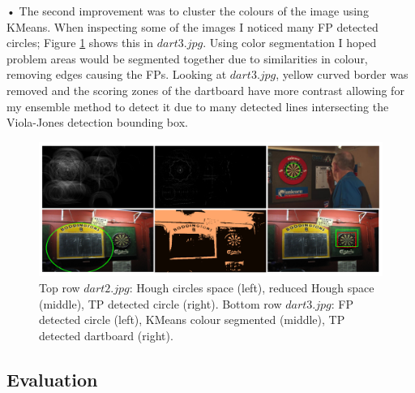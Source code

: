 \documentclass[11pt]{article}
\begin{document}
\noindent • The second improvement was to cluster the colours of the image using KMeans. When inspecting some of the images I noticed many FP detected circles; Figure \ref{detector_improvement_images} shows this in $dart3.jpg$. Using color segmentation I hoped problem areas would be segmented together due to similarities in colour, removing edges causing the FPs. Looking at $dart3.jpg$, yellow curved border was removed and the scoring zones of the dartboard have more contrast allowing for my ensemble method to detect it due to many detected lines intersecting the Viola-Jones detection bounding box.

\begin{figure}[h]
\centering
\includegraphics[width=0.95\linewidth]{figures/04_improvements/detector_improvements_images.png}
\caption{Top row $dart2.jpg$: Hough circles space (left), reduced Hough space (middle), TP detected circle (right). Bottom row $dart3.jpg$: FP detected circle (left), KMeans colour segmented (middle), TP detected dartboard (right).}
\label{detector_improvement_images}
\end{figure}

\subsection{Evaluation}
\end{document}
